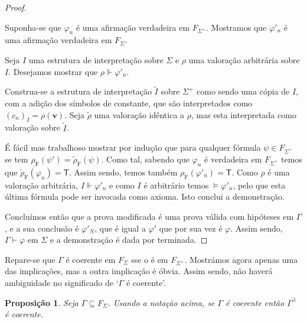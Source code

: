 \documentclass{report}
\newtheorem{prop}{Proposição}
\theoremstyle{definition}
\theoremstyle{remark}
\renewcommand{\bf}[1]{\mathbf{#1}}
\newcommand{\F}{\mathrm{F}}
\newcommand{\lt}{\mathsf{T}}
\begin{document}
\begin{proof}
\begin{enumerate}
	Suponha-se que $\varphi_n$ é uma afirmação verdadeira em $F_{\Sigma^+}$. Mostramos que $\varphi'_n$ é uma afirmação verdadeira em $F_\Sigma$.
	
	Seja $I$ uma estrutura de interpretação sobre $\Sigma$ e $\rho$ uma valoração arbitrária sobre $I$. Desejamos mostrar que $\rho \Vdash \varphi'_n$.
	
	Construa-se a estrutura de interpretação $\tilde I$ sobre $\Sigma^+$ como sendo uma cópia de $I$, com a adição dos símbolos de constante, que são interpretados como $(c_n)_I = \rho(\bf v)$. Seja $\tilde \rho$ uma valoração idêntica a $\rho$, mas esta interpretada como valoração sobre $\tilde I$.
	
	É fácil mas trabalhoso mostrar por indução que para qualquer fórmula $\psi \in F_{\Sigma^+}$ se tem $\rho_\F(\psi') = \tilde\rho_\F(\psi)$. Como tal, sabendo que $\varphi_n$ é verdadeira em $F_{\Sigma^+}$ temos que $\tilde\rho_\F(\varphi_n) = \lt$. Assim sendo, temos também $\rho_\F(\varphi'_n) = \lt$. Como $\rho$ é uma valoração arbitrária, $I \Vdash \varphi'_n$ e como $I$ é arbitrário temos $\vDash \varphi'_n$, pelo que esta última fórmula pode ser invocada como axioma. Isto conclui a demonstração.
	\end{enumerate}
	
	Concluímos então que a prova modificada é uma prova válida com hipóteses em $\Gamma$, e a sua conclusão é $\varphi'_N$, que é igual a $\varphi'$ que por sua vez é $\varphi$. Assim sendo, $\Gamma \vdash \varphi$ em $\Sigma$ e a demonstração é dada por terminada.
	\end{proof}

	Repare-se que $\Gamma$ é coerente em $F_\Sigma$ sse o é em $F_{\Sigma^+}$. Mostrámos agora apenas uma das implicações, mas a outra implicação é óbvia. Assim sendo, não haverá ambiguidade no significado de `$\Gamma$ é coerente'.
	
	\begin{prop}\label{henkincoherence}
	Seja $\Gamma \subseteq F_\Sigma$. Usando a notação acima, se $\Gamma$ é coerente então $\Gamma^\exists$ é coerente.
	\end{prop}
	
\end{document}
